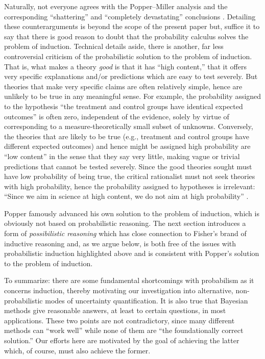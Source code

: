 \documentclass[a4paper, 12pt]{article}
\theoremstyle{plain}
\theoremstyle{definition}
\theoremstyle{remark}
\begin{document}
Naturally, not everyone agrees with the Popper--Miller analysis and the corresponding ``shattering'' and ``completely devastating'' conclusions \citep[e.g.,][]{jeffrey1984, levi1984, good1984, redhead1985}.  Detailing these counterarguments is beyond the scope of the present paper but, suffice it to say that there is good reason to doubt that the probability calculus solves the problem of induction.  Technical details aside, there is another, far less controversial criticism of the probabilistic solution to the problem of induction.  That is, what makes a theory {\em good} is that it has ``high content,'' that it offers very specific explanations and/or predictions which are easy to test severely.  But theories that make very specific claims are often relatively simple, hence are unlikely to be true in any meaningful sense. For example, the probability assigned to the hypothesis ``the treatment and control groups have identical expected outcomes'' is often zero, independent of the evidence, solely by virtue of corresponding to a measure-theoretically small subset of unknowns. Conversely, the theories that are likely to be true (e.g., treatment and control groups have different expected outcomes) and hence might be assigned high probability are ``low content'' in the sense that they say very little, making vague or trivial predictions that cannot be tested severely.  Since the good theories sought must have low probability of being true, the critical rationalist must not seek theories with high probability, hence the probability assigned to hypotheses is irrelevant: ``Since we aim in science at high content, we do not aim at high probability'' \citep[][p.~386]{popper1962}. 

Popper famously advanced his own solution to the problem of induction, which is obviously not based on probabilistic reasoning.  The next section introduces a form of {\em possibilistic reasoning} which has close connection to Fisher's brand of inductive reasoning and, as we argue below, is both free of the issues with probabilistic induction highlighted above and is consistent with Popper's solution to the problem of induction.  

To summarize: there are some fundamental shortcomings with probabilism as it concerns induction, thereby motivating our investigation into alternative, non-probabilistic modes of uncertainty quantification.  It is also true that Bayesian methods give reasonable answers, at least to certain questions, in most applications.  These two points are not contradictory, since many different methods can ``work well'' while none of them are ``the foundationally correct solution.'' Our efforts here are motivated by the goal of achieving the latter which, of course, must also achieve the former.  
\end{document}
